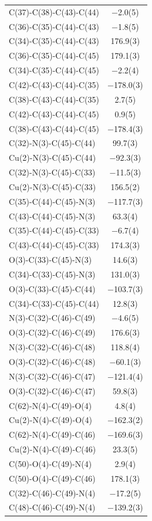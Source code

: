 \begin{center}
{\begin{supertabular}{p{1.8in}c}
C(37)-C(38)-C(43)-C(44)&$-$2.0(5)\\
C(36)-C(35)-C(44)-C(43)&$-$1.8(5)\\
C(34)-C(35)-C(44)-C(43)&176.9(3)\\
C(36)-C(35)-C(44)-C(45)&179.1(3)\\
C(34)-C(35)-C(44)-C(45)&$-$2.2(4)\\
C(42)-C(43)-C(44)-C(35)&$-$178.0(3)\\
C(38)-C(43)-C(44)-C(35)&2.7(5)\\
C(42)-C(43)-C(44)-C(45)&0.9(5)\\
C(38)-C(43)-C(44)-C(45)&$-$178.4(3)\\
C(32)-N(3)-C(45)-C(44)&99.7(3)\\
Cu(2)-N(3)-C(45)-C(44)&$-$92.3(3)\\
C(32)-N(3)-C(45)-C(33)&$-$11.5(3)\\
Cu(2)-N(3)-C(45)-C(33)&156.5(2)\\
C(35)-C(44)-C(45)-N(3)&$-$117.7(3)\\
C(43)-C(44)-C(45)-N(3)&63.3(4)\\
C(35)-C(44)-C(45)-C(33)&$-$6.7(4)\\
C(43)-C(44)-C(45)-C(33)&174.3(3)\\
O(3)-C(33)-C(45)-N(3)&14.6(3)\\
C(34)-C(33)-C(45)-N(3)&131.0(3)\\
O(3)-C(33)-C(45)-C(44)&$-$103.7(3)\\
C(34)-C(33)-C(45)-C(44)&12.8(3)\\
N(3)-C(32)-C(46)-C(49)&$-$4.6(5)\\
O(3)-C(32)-C(46)-C(49)&176.6(3)\\
N(3)-C(32)-C(46)-C(48)&118.8(4)\\
O(3)-C(32)-C(46)-C(48)&$-$60.1(3)\\
N(3)-C(32)-C(46)-C(47)&$-$121.4(4)\\
O(3)-C(32)-C(46)-C(47)&59.8(3)\\
C(62)-N(4)-C(49)-O(4)&4.8(4)\\
Cu(2)-N(4)-C(49)-O(4)&$-$162.3(2)\\
C(62)-N(4)-C(49)-C(46)&$-$169.6(3)\\
Cu(2)-N(4)-C(49)-C(46)&23.3(5)\\
C(50)-O(4)-C(49)-N(4)&2.9(4)\\
C(50)-O(4)-C(49)-C(46)&178.1(3)\\
C(32)-C(46)-C(49)-N(4)&$-$17.2(5)\\
C(48)-C(46)-C(49)-N(4)&$-$139.2(3)\\

\end{supertabular}}
\end{center}
